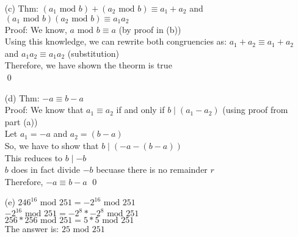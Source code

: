 \documentclass[11pt]{article}
\theoremstyle{definition}
\begin{document}
\begin{enumerate}
	\item[(c)]
	Thm: $(a_1 \text{ mod } b) + (a_2 \text{ mod } b) \equiv a_1+a_2$ and $(a_1 \text{ mod } b)(a_2 \text{ mod } b) \equiv a_1a_2$\\
	Proof: We know, $a \text{ mod } b \equiv a$ (by proof in (b))\\
	Using this knowledge, we can rewrite both congruencies as: $a_1+a_2 \equiv a_1 + a_2$ and $a_1a_2 \equiv a_1a_2$ (substitution)\\
	Therefore, we have shown the theorm is true\\
	\qed

	\item[(d)]
	Thm: $-a \equiv b - a$\\
	Proof: We know that $a_1 \equiv a_2$ if and only if $b \mid (a_1 - a_2)$ (using proof from part (a))\\
	Let $a_1 = -a$ and $a_2 = (b - a)$\\
	So, we have to show that $b \mid (-a - (b - a))$\\
	This reduces to $b \mid -b$\\
	$b$ does in fact divide $-b$ becuase there is no remainder $r$\\
	Therefore, $-a \equiv b - a$ \qed

	\item[(e)]
	$246^{16} \text{ mod } 251 = -2^{16} \text{ mod } 251$\\
	$-2^{16} \text{ mod } 251 = -2^{8} * -2^{8} \text{ mod } 251$\\
	$256 * 256 \text{ mod } 251 = 5 * 5 \text{ mod } 251$\\
	The answer is: $25 \text{ mod } 251$
\end{enumerate}
\end{document}
